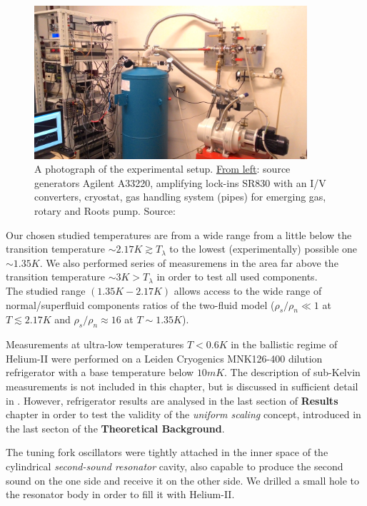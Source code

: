 \begin{figure}[h]
	\centering
	\includegraphics[width=0.9\textwidth]{graphics/exp/apparatus}
	\caption{A photograph of the experimental setup. \underline{From left}: source generators Agilent A33220, amplifying lock-ins SR830 with an I/V converters, cryostat, gas handling system (pipes) for emerging gas, rotary and Roots pump. Source: \cite{bakalaris}}
	\label{cryostat}
\end{figure}

Our chosen studied temperatures are from a wide range from a little below the transition temperature $\sim 2.17\unit{K} \gtrsim T_{\lambda}$ to the lowest (experimentally) possible one $ \sim 1.35\unit{K}$. We also performed series of measuremens in the area far above the transition temperature $\sim 3 \unit{K} > T_{\lambda}$ in order to test all used components.\\
The studied range $(1.35\unit{K} - 2.17\unit{K})$ allows access to the wide range of normal/superfluid components ratios of the two-fluid model ($\rho_s / \rho_n \ll 1$ at $T\lesssim 2.17\unit{K}$ and $\rho_s / \rho_n \approx 16$ at $T\sim 1.35\unit{K}$).

Measurements at ultra-low temperatures $T < 0.6\unit{K}$ in the ballistic regime of Helium-II were performed on a Leiden Cryogenics MNK126-400 dilution refrigerator with a base temperature below $10 \unit{mK}$. The description of sub-Kelvin measurements is not included in this chapter, but is discussed in sufficient detail in \cite{universal_scaling}. However, refrigerator results are analysed in the last section of \textbf{Results} chapter in order to test the validity of the \textit{uniform scaling} concept, introduced in the last secton of the \textbf{Theoretical Background}.

\newpage

The tuning fork oscillators were tightly attached in the inner space of the cylindrical \textit{second-sound resonator} cavity, also capable to produce the second sound on the one side and receive it on the other side. We drilled a small hole to the resonator body in order to fill it with Helium-II.


